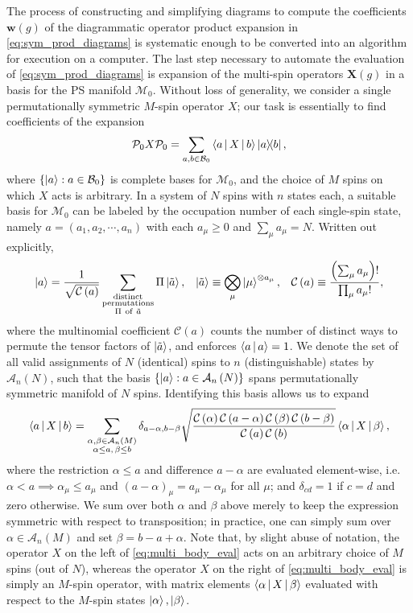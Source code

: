 \documentclass[nofootinbib,notitlepage,11pt]{revtex4-2}
\renewcommand{\t}{\text} %
\newcommand{\f}[2]{\dfrac{#1}{#2}} %
\newcommand{\p}[1]{\left(#1\right)} %
\renewcommand{\set}[1]{\left\{#1\right\}} %
\newcommand{\bk}{\Braket} %
\newcommand{\m}{\bm} %
\newcommand{\1}{\mathds{1}}
\newcommand{\A}{\mathcal{A}}
\newcommand{\B}{\mathcal{B}}
\newcommand{\C}{\mathcal{C}}
\newcommand{\M}{\mathcal{M}}
\renewcommand{\P}{\mathcal{P}}
\begin{document}
The process of constructing and simplifying diagrams to compute the
coefficients $\m w\p{g}$ of the diagrammatic operator product
expansion in \eqref{eq:sym_prod_diagrams} is systematic enough to be
converted into an algorithm for execution on a computer.  The last
step necessary to automate the evaluation of
\eqref{eq:sym_prod_diagrams} is expansion of the multi-spin operators
$\m X\p{g}$ in a basis for the PS manifold $\M_0$.  Without loss of
generality, we consider a single permutationally symmetric $M$-spin
operator $X$; our task is essentially to find coefficients of the
expansion
\begin{align}
  \P_0 X \P_0
  = \sum_{a,b\in\B_0} \bk{a|X|b} \op{a}{b},
\end{align}
where $\set{\ket{a}:a\in\B_0}$ is complete bases for $\M_0$, and the
choice of $M$ spins on which $X$ acts is arbitrary.  In a system of
$N$ spins with $n$ states each, a suitable basis for $\M_0$ can be
labeled by the occupation number of each single-spin state, namely
$a=\p{a_1,a_2,\cdots,a_n}$ with each $a_\mu\ge 0$ and
$\sum_\mu a_\mu=N$.  Written out explicitly,
\begin{align}
  \ket{a} = \f1{\sqrt{\C\p{a}}}
  \sum_{\substack{\t{distinct}\\\t{permutations}\\\Pi~\t{of}~\tilde a}}
  \Pi \ket{\tilde a},
  &&
  \ket{\tilde a} \equiv \bigotimes_\mu \ket{\mu}^{\otimes a_\mu},
  &&
  \C\p{a} \equiv \f{\p{\sum_\mu a_\mu}!}{\prod_\mu a_\mu!},
\end{align}
where the multinomial coefficient $\C\p{a}$ counts the number of
distinct ways to permute the tensor factors of $\ket{\tilde a}$, and
enforces $\bk{a|a}=1$.  We denote the set of all valid assignments of
$N$ (identical) spins to $n$ (distinguishable) states by $\A_n\p{N}$,
such that the basis $\set{\ket{a}:a\in\A_n\p{N}}$ spans
permutationally symmetric manifold of $N$ spins.  Identifying this
basis allows us to expand
\begin{align}
  \bk{a|X|b}
  = \sum_{\substack{\alpha,\beta\in\A_n\p{M}\\\alpha\le a,\,\beta\le b}}
  \delta_{a-\alpha,b-\beta}
  \sqrt{\f{\C\p{\alpha}\C\p{a-\alpha}\C\p{\beta}\C\p{b-\beta}}
    {\C\p{a}\C\p{b}}}
  \bk{\alpha|X|\beta},
  \label{eq:multi_body_eval}
\end{align}
where the restriction $\alpha\le a$ and difference $a-\alpha$ are
evaluated element-wise, i.e.~$\alpha<a\implies \alpha_\mu\le a_\mu$
and $\p{a-\alpha}_\mu=a_\mu-\alpha_\mu$ for all $\mu$; and
$\delta_{cd}=1$ if $c=d$ and zero otherwise.  We sum over both
$\alpha$ and $\beta$ above merely to keep the expression symmetric
with respect to transposition; in practice, one can simply sum over
$\alpha\in\A_n\p{M}$ and set $\beta=b-a+\alpha$.  Note that, by slight
abuse of notation, the operator $X$ on the left of
\eqref{eq:multi_body_eval} acts on an arbitrary choice of $M$ spins
(out of $N$), whereas the operator $X$ on the right of
\eqref{eq:multi_body_eval} is simply an $M$-spin operator, with matrix
elements $\bk{\alpha|X|\beta}$ evaluated with respect to the $M$-spin
states $\ket\alpha,\ket\beta$.
\end{document}
